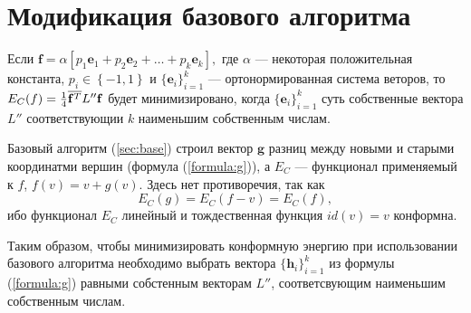\section{Модификация базового алгоритма}
\label{sec:minimization}

Если $\mathbf{f} = \alpha \left[ p_1 \mathbf{e}_1 + p_2 \mathbf{e}_2 + \dots + p_k \mathbf{e}_k \right],$ 
где $\alpha$ --- некоторая положительная константа, $p_i \in \left\{-1, 1 \right\}$ и 
$\{\mathbf{e}_i\}_{i=1}^k$ --- ортонормированная система веторов, то 
$E_C(f) = \frac{1}{4}\overline{\mathbf{f}^T} L'' \mathbf{f}$ будет минимизировано, 
когда $\{\mathbf{e}_i\}_{i=1}^k$ суть собственные вектора $L''$ соответствующии $k$ наименьшим 
собственным числам. 

Базовый алгоритм (\ref{sec:base}) строил вектор $\mathbf{g}$ разниц между новыми и старыми
координатми вершин (формула (\ref{formula:g})), а $E_C$ --- функционал применяемый к $f$, 
$f(v) = v + g(v)$. Здесь нет противоречия, так как $$E_C(g) = E_C(f - v) = E_C(f),$$ ибо
функционал $E_C$ линейный и тождественная функция $id(v) = v$ конформна. 

Таким образом, чтобы минимизировать конформную энергию при использовании базового алгоритма 
необходимо выбрать вектора $\{\mathbf{h}_i\}_{i=1}^k$ из формулы (\ref{formula:g}) равными собстенным векторам $L''$, соответсвующим наименьшим собственным числам.

